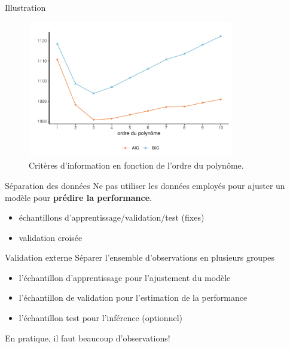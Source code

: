 \documentclass[
  ignorenonframetext,
]{beamer}
\providecommand{\tightlist}{%
  \setlength{\itemsep}{0pt}\setlength{\parskip}{0pt}}\usepackage{longtable,booktabs,array}
\begin{document}
\begin{frame}{Illustration}
\protect\hypertarget{illustration}{}
\begin{figure}

{\centering \includegraphics[width=0.8\textwidth,height=\textheight]{MATH60602-diapos4_files/figure-beamer/fig-polynome-ajustement-1.pdf}

}

\caption{\label{fig-polynome-ajustement}Critères d'information en
fonction de l'ordre du polynôme.}

\end{figure}
\end{frame}

\begin{frame}{Séparation des données}
\protect\hypertarget{suxe9paration-des-donnuxe9es}{}
Ne pas utiliser les données employés pour ajuster un modèle pour
\textbf{prédire la performance}.

\begin{itemize}
\tightlist
\item
  échantillons d'apprentissage/validation/test (fixes)
\item
  validation croisée
\end{itemize}
\end{frame}

\begin{frame}{Validation externe}
\protect\hypertarget{validation-externe}{}
Séparer l'ensemble d'observations en plusieurs groupes

\begin{itemize}
\tightlist
\item
  l'échantillon d'apprentissage pour l'ajustement du modèle
\item
  l'échantillon de validation pour l'estimation de la performance
\item
  l'échantillon test pour l'inférence (optionnel)
\end{itemize}

En pratique, il faut beaucoup d'observations!
\end{frame}
\end{document}
